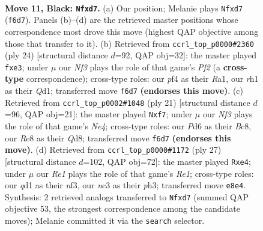 \documentclass[11pt]{article}
\begin{document}
\clearpage

\begin{figure}[p]\centering
\begin{subfigure}{0.46\textwidth}\centering
\resizebox{\linewidth}{!}{%
\newchessgame
\chessboard[
  setfen={rn1qr1k1/pp1B1pbp/3p1np1/2pP4/P3PP1P/2N5/1P4P1/R1BQK1NR b KQ - 0 11},
  showmover=false,
  pgfstyle=straightmove, color=movearrow, markmove={f6-d7}
]}
\caption{}
\end{subfigure}\hfill
\begin{subfigure}{0.46\textwidth}\centering
\resizebox{\linewidth}{!}{%
\newchessgame
\chessboard[
  setfen={r1bqr1k1/2pn1pp1/2pp3p/p3p3/P3P3/3PbN1P/1PP2PP1/R2QRNK1 w - - 0 13},
  showmover=false,
  pgfstyle=straightmove, color=movearrow, markmove={f2-e3}
]}
\caption{}
\end{subfigure}
\\[4pt]
\begin{subfigure}{0.46\textwidth}\centering
\resizebox{\linewidth}{!}{%
\newchessgame
\chessboard[
  setfen={r1bqk2r/1p2pPbp/p5p1/2pPn3/P5n1/2N2N2/1PP3PP/R1BQKB1R b KQkq - 0 11},
  showmover=false,
  pgfstyle=straightmove, color=movearrow, markmove={e5-f7}
]}
\caption{}
\end{subfigure}\hfill
\begin{subfigure}{0.46\textwidth}\centering
\resizebox{\linewidth}{!}{%
\newchessgame
\chessboard[
  setfen={rn1qr1k1/p4pbp/3p1np1/1BpP4/4P3/5N1P/PP3PP1/R1BQR1K1 b - - 0 14},
  showmover=false,
  pgfstyle=straightmove, color=movearrow, markmove={e8-e4}
]}
\caption{}
\end{subfigure}
\caption{\textbf{Move 11, Black: \texttt{Nfxd7}.} (a) Our position; Melanie plays \texttt{Nfxd7} (\texttt{f6d7}). Panels (b)--(d) are the retrieved master positions whose correspondence most drove this move (highest QAP objective among those that transfer to it). (b) Retrieved from \texttt{ccrl\_top\_p0000\#2360} (ply 24) [structural distance $d$=92, QAP obj=32]: the master played \texttt{fxe3}; under $\mu$ our \emph{Nf3} plays the role of that game's \emph{Pf2} (a \textbf{cross-type} correspondence); cross-type roles: our \emph{p}f4 as their \emph{R}a1, our \emph{r}h1 as their \emph{Q}d1; transferred move \texttt{f6d7} \textbf{(endorses this move)}. (c) Retrieved from \texttt{ccrl\_top\_p0002\#1048} (ply 21) [structural distance $d$=96, QAP obj=21]: the master played \texttt{Nxf7}; under $\mu$ our \emph{Nf3} plays the role of that game's \emph{Ne4}; cross-type roles: our \emph{P}d6 as their \emph{B}c8, our \emph{R}e8 as their \emph{Q}d8; transferred move \texttt{f6d7} \textbf{(endorses this move)}. (d) Retrieved from \texttt{ccrl\_top\_p0000\#1172} (ply 27) [structural distance $d$=102, QAP obj=72]: the master played \texttt{Rxe4}; under $\mu$ our \emph{Re1} plays the role of that game's \emph{Re1}; cross-type roles: our \emph{q}d1 as their \emph{n}f3, our \emph{n}c3 as their \emph{p}h3; transferred move \texttt{e8e4}. Synthesis: 2 retrieved analogs transferred to \texttt{Nfxd7} (summed QAP objective 53, the strongest correspondence among the candidate moves); Melanie committed it via the \texttt{search} selector.}
\label{fig:thought-m21}
\end{figure}
\end{document}
